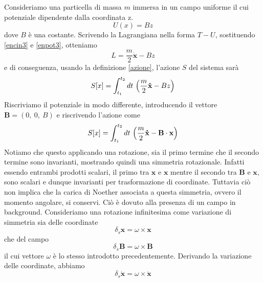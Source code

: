 \begin{example} 
    Consideriamo una particella di massa $m$ immersa in un campo uniforme il cui potenziale dipendente dalla coordinata z. 
\begin{equation}\label{enpot3}
    U(x) = B z
\end{equation}
    dove $B$ è una costante. Scrivendo la Lagrangiana nella forma $T - U$, sostituendo \eqref{encin3} e \eqref{enpot3}, otteniamo 
\begin{equation} \label{lag3}
    L = \frac{m}{2} \mathbf{\dot x} - B z
\end{equation}
    e di conseguenza, usando la definizione \eqref{azione}, l'azione $S$ del sistema sarà
\begin{equation}
    S[x] = \int_{t_1}^{t_2}dt~ \Big( \frac{m}{2} \mathbf{\dot x} - B z \Big)
\end{equation}
    Riscriviamo il potenziale in modo differente, introducendo il vettore $\mathbf B = (0,~0,~B)$ e riscrivendo l'azione come
\begin{equation}
    S[x] = \int_{t_1}^{t_2}dt~ \Big( \frac{m}{2} \mathbf{\dot x} - \mathbf B \cdot \mathbf x \Big)
\end{equation}
    Notiamo che questo applicando una rotazione, sia il primo termine che il secondo termine sono invarianti, mostrando quindi una simmetria rotazionale. Infatti essendo entrambi prodotti scalari, il primo tra $\mathbf x$ e $\mathbf x$ mentre il secondo tra $\mathbf B$ e $\mathbf x$, sono scalari e dunque invarianti per trasformazione di coordinate. Tuttavia ciò non implica che la carica di Noether associata a questa simmetria, ovvero il momento angolare, si conservi. Ciò è dovuto alla presenza di un campo in background. Consideriamo una rotazione infinitesima come variazione di simmetria sia delle coordinate 
\begin{equation}
    \delta_s \mathbf x = \omega \times \mathbf x
\end{equation}
    che del campo
\begin{equation}
    \delta_s \mathbf B = \omega \times \mathbf B
\end{equation}
    il cui vettore $\omega$ è lo stesso introdotto precedentemente. Derivando la variazione delle coordinate, abbiamo
\begin{equation}
    \delta_s \mathbf{\dot x} = \omega \times \mathbf{\dot x}
\end{equation}
    

\end{example}

